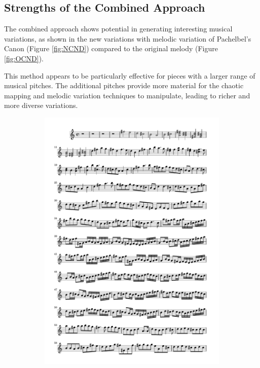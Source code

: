 \documentclass[11pt]{article}
\theoremstyle{definition}
\begin{document}
\subsection{Strengths of the Combined Approach}

The combined approach shows potential in generating interesting musical variations, as shown in the new variations with melodic variation of Pachelbel's Canon \cite{pachelbel_canon_2005} (Figure \ref{fig:NCND}) compared to the original melody (Figure \ref{fig:OCND}).

This method appears to be particularly effective for pieces with a larger range of musical pitches. The additional pitches provide more material for the chaotic mapping and melodic variation techniques to manipulate, leading to richer and more diverse variations.

\begin{figure}
\begin{subfigure}{\textwidth}
\centering
\includegraphics[trim=1cm 26.5cm 1cm 0.5cm, clip, scale=0.8]{Original_CND.pdf}

\end{subfigure}
\end{figure}
\end{document}
